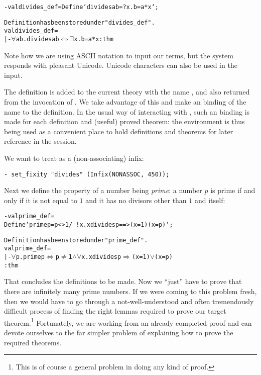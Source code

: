 \begin{session}
\begin{alltt}
- val divides_def = Define `divides a b = ?x. b = a * x`;

Definition has been stored under "divides_def".
val divides_def =
  |- \(\forall\)a b. divides a b \(\iff\) \(\exists\)x. b = a * x : thm
\end{alltt}
\end{session}
Note how we are using ASCII notation to input our terms, but the system responds with pleasant Unicode.
Unicode characters can also be used in the input.

The definition is added to the current theory with the name
, and also returned from the invocation of
. We take advantage of this and make an \ML{} binding of
the name  to the definition. In the usual way of
interacting with \HOL, such an \ML{} binding is made for each
definition and (useful) proved theorem: the \ML{} environment is thus
being used as a convenient place to hold definitions and theorems for
later reference in the session.

We want to treat  as a (non-associating) infix:
\begin{session}
\begin{verbatim}
- set_fixity "divides" (Infix(NONASSOC, 450));
\end{verbatim}
\end{session}
Next we define the property of a number being \emph{prime}: a number $p$ is
prime if and only if it is not equal to $1$ and it has no divisors other
than $1$ and itself:

\begin{session}
\begin{alltt}
- val prime_def =
    Define `prime p = p <> 1 /\ !x. x divides p ==> (x=1) \/ (x=p)`;

Definition has been stored under "prime_def".
val prime_def =
    |- \(\forall\)p. prime p \(\iff\) p \(\ne\) 1 \(\land\) \(\forall\)x. x divides p \(\Rightarrow\) (x = 1) \(\lor\) (x = p)
    : thm
\end{alltt}
\end{session}

That concludes the definitions to be made. Now we ``just'' have to prove
that there are infinitely many prime numbers. If we were coming to this
problem fresh, then we would have to go through a not-well-understood
and often tremendously difficult process of finding the right lemmas
required to prove our target theorem.\footnote{This is of course a
general problem in doing any kind of proof.} Fortunately, we are working
from an already completed proof and can devote ourselves to the far
simpler problem of explaining how to prove the required theorems.

